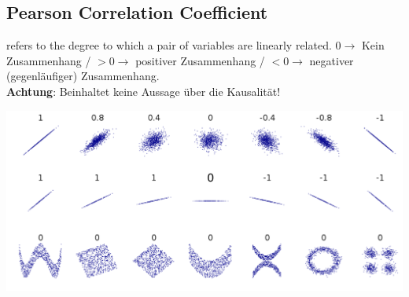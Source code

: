\subsection{Pearson Correlation Coefficient}
refers to the degree to which a pair of variables are linearly related. $0\rightarrow$ Kein Zusammenhang / $>0\rightarrow$ positiver Zusammenhang / $<0\rightarrow$ negativer (gegenläufiger) Zusammenhang.\\
\textbf{Achtung}: Beinhaltet keine Aussage über die Kausalität!  

\includegraphics[width=\linewidth]{./img/pearson_correlation_coefficient.png}